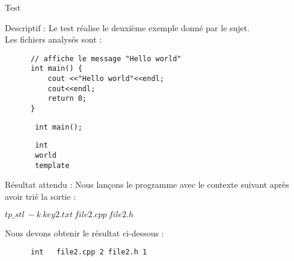 \documentclass{article}
\begin{document}
   \newpage 
       
  \begin{subsection}{Test }
  
    \begin{paragraph}{Descriptif :}
	Le test  réalise le deuxième exemple donné par le sujet.\\ Les fichiers analysés sont : 
      
      \begin{listing}[h!]
      \begin{verbatim}
	  // affiche le message "Hello world"
	  int main() {
	      cout <<"Hello world"<<endl;
	      cout<<endl;
	      return 0;
	  }
      \end{verbatim}
      \end{listing}
      
      \begin{listing}[h!]
	\begin{verbatim}
	   int main();
	\end{verbatim}
      \end{listing}
      
        \begin{listing}[h!]
	\begin{verbatim}
	   int
	   world
	   template
	\end{verbatim}
      \end{listing}
      
    \end{paragraph}
	   
    \begin{paragraph}{Résultat attendu :}
       Nous lançons le programme avec le contexte suivant après avoir trié la sortie :  
       \begin{center}
	\textbf{$tp\_stl\ -k\ key2.txt\ file2.cpp\ file2.h$}
      \end{center}
      
      Nous devons obtenir le résultat ci-dessous : 
      \begin{listing}[h!]
      \begin{verbatim}
	  int	file2.cpp 2	file2.h 1	
      \end{verbatim}
  
      \end{listing}
    \end{paragraph}

  \end{subsection}
\end{document}
